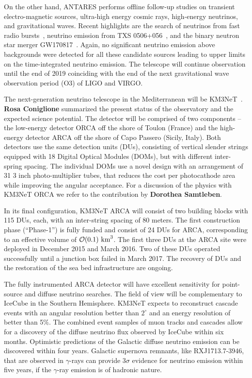 \documentclass{PoS}
\begin{document}
On the other hand, ANTARES performs offline follow-up studies on transient electro-magnetic sources, ultra-high energy cosmic rays, high-energy neutrinos, and gravitational waves. Recent highlights are the search of neutrinos from fast radio bursts~\cite{Albert:2018euo}, neutrino emission from TXS 0506+056~\cite{Albert:2018kjg}, and the binary neutron star merger GW170817~\cite{ANTARES:2017bia}. Again, no significant neutrino emission above backgrounds were detected for all these candidate sources leading to upper limits on the time-integrated neutrino emission. The telescope will continue observation until the end of 2019 coinciding with the end of the next gravitational wave observation period (O3) of LIGO and VIRGO.

The next-generation neutrino telescope in the Mediterranean will be KM3NeT~\cite{Adrian-Martinez:2016fdl}. {\bf Rosa Coniglione} summarized the present status of the observatory and the expected science potential. The detector will be comprised of two components -- the low-energy detector ORCA off the shore of Toulon (France) and the high-energy detector ARCA  off the shore of Capo Passero (Sicily, Italy). Both detectors use the same detection units (DUs), consisting of vertical slender strings equipped with 18 Digital Optical Modules (DOMs), but with different inter-spring spacing. The individual DOMs use a novel design with an arrangement of 31 3 inch photo-multiplier tubes, that reduces the cost per photocathode area while improving the angular acceptance. For a discussion of the physics with KM3NeT ORCA we refer to the contribution by {\bf Dorothea Samtleben}.

In its final configuration, KM3NeT ARCA will consist of two building blocks with 115 DUs, each, with an inter-string spacing of 80 meters. The first construction phase (``Phase-1'') is fully funded and consist of 24 DUs for ARCA, corresponding to an effective volume of $\mathcal{O}(0.1)~{\rm km}^{3}$. The first three DUs at the ARCA site were deployed in December 2015 and March 2016. Two of these DUs operated successfully until a junction box failed in March 2017. The recovery of DUs and the restoration of the sea bed infrastructure are ongoing.

The fully instrumented ARCA detector will have excellent sensitivity for point-source and diffuse neutrino searches. The field of view will be complementary to IceCube in the Southern Hemisphere. KM3NeT expects to reconstruct cascade events with an angular resolution better than $2^\circ$ and an energy resolution of better than 5\%. The combined event samples of muon tracks and cascades allow for a discovery of the diffuse neutrino flux observed by IceCube within six months. Optimistic predictions of the Galactic diffuse neutrino emission can be discovered within four years. Galactic supernova remnants, like RXJ1713.7-3946, that are observed in $\gamma$-rays can provide $3\sigma$ evidence for neutrino emission within five years, if the $\gamma$-ray emission is of hadronic nature.
\end{document}
